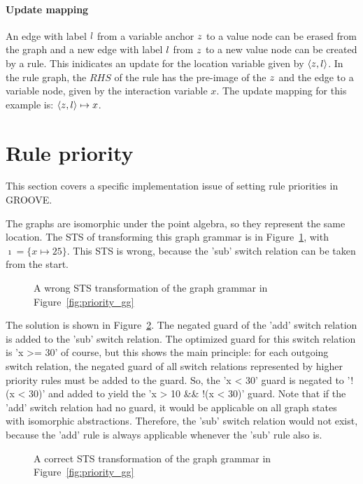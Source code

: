 \paragraph*{Update mapping}\label{sec:updates}
An edge with label $l$ from a variable anchor $z$ to a value node can be erased from the graph and a new edge with label $l$ from $z$ to a new value node can be created by a rule. This inidicates an update for the location variable given by $\langle z, l \rangle$. In the rule graph, the $\mathit{RHS}$ of the rule has the pre-image of the $z$ and the edge to a variable node, given by the interaction variable $x$. The update mapping for this example is: $\langle z, l \rangle \mapsto x$.

\section{Rule priority}
This section covers a specific implementation issue of setting rule priorities in GROOVE.

The graphs are isomorphic under the point algebra, so they represent the same location. The STS of transforming this graph grammar is in Figure~\ref{fig:priority_sts_wrong}, with $\imath = \{x \mapsto 25\}$. This STS is wrong, because the 'sub' switch relation can be taken from the start.

\begin{figure}[ht]
  \begin{center}
    
  \end{center}
  \caption{A wrong STS transformation of the graph grammar in Figure~\ref{fig:priority_gg}}
  \label{fig:priority_sts_wrong}
\end{figure}

The solution is shown in Figure~\ref{fig:priority_sts_right}. The negated guard of the 'add' switch relation is added to the 'sub' switch relation. The optimized guard for this switch relation is 'x >= 30' of course, but this shows the main principle: for each outgoing switch relation, the negated guard of all switch relations represented by higher priority rules must be added to the guard. So, the 'x < 30' guard is negated to '!(x < 30)' and added to yield the 'x > 10 \&\& !(x < 30)' guard. Note that if the 'add' switch relation had no guard, it would be applicable on all graph states with isomorphic abstractions. Therefore, the 'sub' switch relation would not exist, because the 'add' rule is always applicable whenever the 'sub' rule also is.

\begin{figure}[ht]
  \begin{center}
    
  \end{center}
  \caption{A correct STS transformation of the graph grammar in Figure~\ref{fig:priority_gg}}
  \label{fig:priority_sts_right}
\end{figure}

